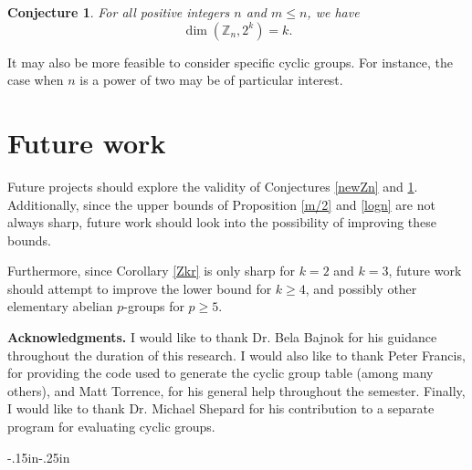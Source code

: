 \documentclass[11pt]{article}
\newcommand{\Z}{\mathbb{Z}}
\newtheorem{conj}[thm]{Conjecture}
\begin{document}
\begin{conj}\label{newZn2^k}
    For all positive integers $n$ and $m\leq n$, we have
    \[\dim(\Z_n,2^k)=k.\]
\end{conj}

It may also be more feasible to consider specific cyclic groups. For instance, the case when $n$ is a power of two may be of particular interest.

\section{Future work}

Future projects should explore the validity of Conjectures \ref{newZn} and \ref{newZn2^k}. Additionally, since the upper bounds of Proposition \ref{m/2} and \ref{logn} are not always sharp, future work should look into the possibility of improving these bounds. 

Furthermore, since Corollary \ref{Zkr} is only sharp for $k=2$ and $k=3$, future work should attempt to improve the lower bound for $k\geq4$, and possibly other elementary abelian $p$-groups for $p\geq5$.

{\bf Acknowledgments.} I would like to thank Dr. Bela Bajnok for his guidance throughout the duration of this research. I would also like to thank Peter Francis, for providing the code used to generate the cyclic group table (among many others), and Matt Torrence, for his general help throughout the semester. Finally, I would like to thank Dr. Michael Shepard for his contribution to a separate program for evaluating cyclic groups.

\begin{adjustwidth}{-.15in}{-.25in}
\printbibliography
\end{adjustwidth}
\end{document}

